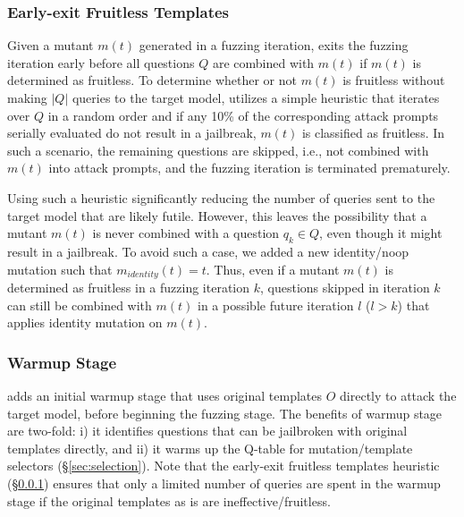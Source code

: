 \subsubsection{Early-exit Fruitless Templates}
\label{sec:early_exit}
Given a mutant $m(t)$ generated in a fuzzing iteration, \bedrockfuzz exits the fuzzing iteration early before all questions $Q$ are combined with $m(t)$ if $m(t)$ is determined as fruitless. To determine whether or not $m(t)$ is fruitless without making $|Q|$ queries to the target model, \bedrockfuzz utilizes a simple heuristic that iterates over $Q$ in a random order and if any 10\% of the corresponding attack prompts serially evaluated do not result in a jailbreak, $m(t)$ is classified as fruitless. In such a scenario, the remaining questions are skipped, i.e., not combined with $m(t)$ into attack prompts, and the fuzzing iteration is terminated prematurely.

Using such a heuristic significantly reducing the number of queries sent to the target model that are likely futile. However, this leaves the possibility that a mutant $m(t)$ is never combined with a question $q_k \in Q$, even though it might result in a jailbreak. To avoid such a case, we added a new identity/noop mutation such that $m_{identity}(t) = t$. Thus, even if a mutant $m(t)$ is determined as fruitless in a fuzzing iteration $k$, questions skipped in iteration $k$ can still be combined with $m(t)$ in a possible future iteration $l$ ($l > k$) that applies identity mutation on $m(t)$.

\subsubsection{Warmup Stage}
\label{sec:warmup}
\bedrockfuzz adds an initial warmup stage that uses original templates $O$ directly to attack the target model, before beginning the fuzzing stage. The benefits of warmup stage are two-fold: i) it identifies questions that can be jailbroken with original templates directly, and ii) it warms up the Q-table for mutation/template selectors (\S\ref{sec:selection}). Note that the early-exit fruitless templates heuristic (\S\ref{sec:early_exit}) ensures that only a limited number of queries are spent in the warmup stage if the original templates as is are ineffective/fruitless. 







